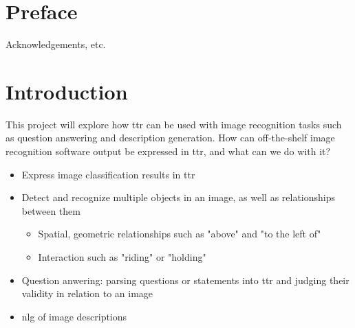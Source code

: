 \documentclass[11pt, a4paper]{article}
\begin{document}
\newpage
\section*{Preface}

Acknowledgements, etc.

\thispagestyle{empty}

\newpage

\begin{spacing}{0.0}
\tableofcontents
\end{spacing}

\thispagestyle{empty}

\newpage
\setcounter{page}{1}

\section{Introduction}
\label{sec:intro}

This project will explore how \gls{ttr} can be used with image recognition tasks such as question answering and description generation.
How can off-the-shelf image recognition software output be expressed in \gls{ttr}, and what can we do with it?

\begin{itemize}
\item Express image classification results in \gls{ttr}
\item Detect and recognize multiple objects in an image, as well as relationships between them
\begin{itemize}
\item Spatial, geometric relationships such as "above" and "to the left of"
\item Interaction such as "riding" or "holding"
\end{itemize}
\item Question anwering: parsing questions or statements into \gls{ttr} and judging their validity in relation to an image
\item \gls{nlg} of image descriptions
\end{itemize}
\end{document}
